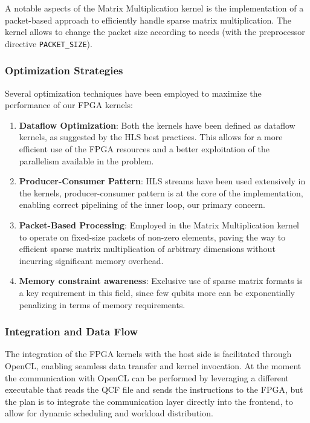 \documentclass[12pt,oneside,a4paper]{article}
\begin{document}
A notable aspects of the Matrix Multiplication kernel is the implementation of a packet-based approach to efficiently handle sparse matrix multiplication. The kernel allows to change the packet size according to needs (with the preprocessor directive \texttt{PACKET\_SIZE}).


\subsubsection{Optimization Strategies}

Several optimization techniques have been employed to maximize the performance of our FPGA kernels:

\begin{enumerate}
    \item \textbf{Dataflow Optimization}: Both the kernels have been defined as dataflow kernels, as suggested by the HLS best practices. This allows for a more efficient use of the FPGA resources and a better exploitation of the parallelism available in the problem.
    \item \textbf{Producer-Consumer Pattern}: HLS streams have been used extensively in the kernels, producer-consumer pattern is at the core of the implementation, enabling correct pipelining of the inner loop, our primary concern.
    \item \textbf{Packet-Based Processing}: Employed in the Matrix Multiplication kernel to operate on fixed-size packets of non-zero elements, paving the way to efficient sparse matrix multiplication of arbitrary dimensions without incurring significant memory overhead.
    \item \textbf{Memory constraint awareness}: Exclusive use of sparse matrix formats is a key requirement in this field, since few qubits more can be exponentially penalizing in terms of memory requirements.
\end{enumerate}

\subsubsection{Integration and Data Flow}

The integration of the FPGA kernels with the host side is facilitated through OpenCL, enabling seamless data transfer and kernel invocation. At the moment the communication with OpenCL can be performed by leveraging a different executable that reads the QCF file and sends the instructions to the FPGA, but the plan is to integrate the communication layer directly into the frontend, to allow for dynamic scheduling and workload distribution.
\end{document}

